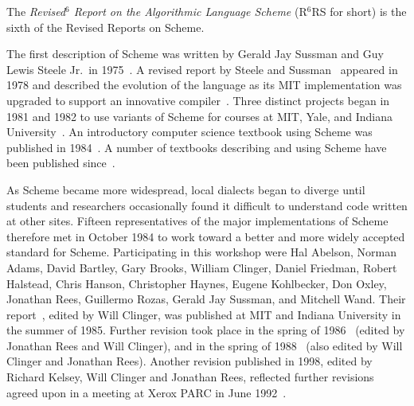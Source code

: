 \documentclass[twoside,twocolumn]{algol60}
\newcommand{\rn}[1]{R$^{#1}$RS}
\begin{document}
The \textit{Revised$^6$ Report on the Algorithmic Language Scheme}
(\rn{6} for short) is the sixth of the Revised Reports on Scheme.

\vest The first description of Scheme was written by Gerald Jay
Sussman and Guy Lewis Steele Jr.\ in
1975~\cite{Scheme75}.  A revised report by Steele and
Sussman~\cite{Scheme78}
appeared in 1978 and described the evolution
of the language as its MIT implementation was upgraded to support an
innovative compiler~\cite{Rabbit}.  Three distinct projects began in
1981 and 1982 to use variants of Scheme for courses at MIT, Yale, and
Indiana University~\cite{Rees82,MITScheme,Scheme311}\nocite{Scheme84}.  An introductory
computer science textbook using Scheme was published in
1984~\cite{SICP}.  A number of textbooks describing and using Scheme
have been published since~\cite{tspl3}.

\vest As Scheme became more widespread,
local dialects began to diverge until students and researchers
occasionally found it difficult to understand code written at other
sites.
Fifteen representatives of the major implementations of Scheme therefore
met in October 1984 to work toward a better and more widely accepted
standard for Scheme.
Participating in this workshop were Hal Abelson, Norman Adams, David
Bartley, Gary Brooks, William Clinger, Daniel Friedman, Robert Halstead,
Chris Hanson, Christopher Haynes, Eugene Kohlbecker, Don Oxley, Jonathan Rees,
Guillermo Rozas, Gerald Jay Sussman, and Mitchell Wand.
Their report~\cite{RRRS}, edited by Will Clinger,
was published at MIT and Indiana University in the summer of 1985.
Further revision took place in the spring of 1986~\cite{R3RS} (edited
by Jonathan Rees and Will Clinger),
and in the spring of 1988~\cite{R4RS} (also edited by Will Clinger and
Jonathan Rees).  Another revision published in 1998, edited
by Richard Kelsey, Will Clinger and Jonathan Rees,
reflected further revisions agreed upon in a meeting at Xerox PARC in
June 1992~\cite{R5RS}.
\end{document}
